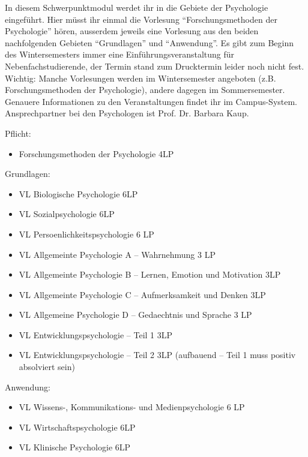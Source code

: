 
In diesem Schwerpunktmodul werdet ihr in die Gebiete der Psychologie eingeführt.
Hier müsst ihr einmal die Vorlesung "`Forschungsmethoden der Psychologie"' hören, ausserdem jeweils eine Vorlesung aus den beiden nachfolgenden Gebieten "`Grundlagen"' und "`Anwendung"'.
Es gibt zum Beginn des Wintersemesters immer eine Einführungsveranstaltung für Nebenfachstudierende, der Termin stand zum Drucktermin leider noch nicht fest.
Wichtig: Manche Vorlesungen werden im Wintersemester angeboten (z.B. Forschungsmethoden der Psychologie),
andere dagegen im Sommersemester. Genauere Informationen zu den Veranstaltungen findet ihr im Campus-System.
Ansprechpartner bei den Psychologen ist Prof. Dr. Barbara Kaup.

\pagebreak

Pflicht:
\begin{itemize}
\item Forschungsmethoden der Psychologie 4LP
\end{itemize}


Grundlagen:
\begin{itemize}
 \item VL Biologische Psychologie 6LP
 \item VL Sozialpsychologie 6LP
 \item VL Persoenlichkeitspsychologie 6 LP
 \item VL Allgemeinte Psychologie A -- Wahrnehmung 3 LP
 \item VL Allgemeinte Psychologie B -- Lernen, Emotion und Motivation 3LP
 \item VL Allgemeinte Psychologie C -- Aufmerksamkeit und Denken 3LP
 \item VL Allgemeine Psychologie D -- Gedaechtnis und Sprache 3 LP
 \item VL Entwicklungspsychologie -- Teil 1 3LP
 \item VL Entwicklungspsychologie -- Teil 2 3LP (aufbauend -- Teil 1 muss positiv absolviert sein)
\end{itemize}


Anwendung:
\begin{itemize}
\item VL Wissens-, Kommunikations- und Medienpsychologie 6 LP
\item VL Wirtschaftspsychologie 6LP
\item VL Klinische Psychologie 6LP
\end{itemize}




